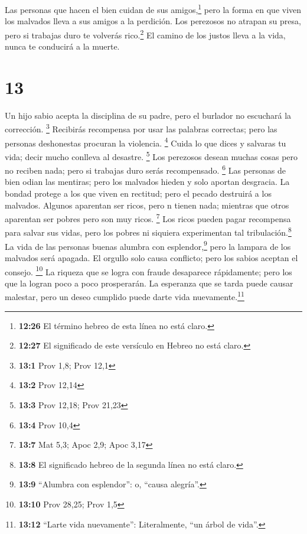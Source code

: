  Las personas que hacen el bien cuidan de sus
amigos,\footnote{\textbf{12:26} El término hebreo de esta línea no está
  claro.} pero la forma en que viven los malvados lleva a sus amigos a
la perdición.  Los perezosos no atrapan su presa, pero si
trabajas duro te volverás rico.\footnote{\textbf{12:27} El significado
  de este versículo en Hebreo no está claro.}  El camino
de los justos lleva a la vida, nunca te conducirá a la muerte.

\hypertarget{section-12}{%
\section{13}\label{section-12}}

 Un hijo sabio acepta la disciplina de su padre, pero el
burlador no escuchará la corrección. \footnote{\textbf{13:1} Prov 1,8;
  Prov 12,1}  Recibirás recompensa por usar las palabras
correctas; pero las personas deshonestas procuran la violencia.
\footnote{\textbf{13:2} Prov 12,14}  Cuida lo que dices y
salvaras tu vida; decir mucho conlleva al desastre. \footnote{\textbf{13:3}
  Prov 12,18; Prov 21,23}  Los perezosos desean muchas
cosas pero no reciben nada; pero si trabajas duro serás recompensado.
\footnote{\textbf{13:4} Prov 10,4}  Las personas de bien
odian las mentiras; pero los malvados hieden y solo aportan desgracia.
 La bondad protege a los que viven en rectitud; pero el
pecado destruirá a los malvados.  Algunos aparentan ser
ricos, pero n tienen nada; mientras que otros aparentan ser pobres pero
son muy ricos. \footnote{\textbf{13:7} Mat 5,3; Apoc 2,9; Apoc 3,17}
 Los ricos pueden pagar recompensa para salvar sus vidas,
pero los pobres ni siquiera experimentan tal tribulación.\footnote{\textbf{13:8}
  El significado hebreo de la segunda línea no está claro.}
 La vida de las personas buenas alumbra con
esplendor,\footnote{\textbf{13:9} ``Alumbra con esplendor'': o, ``causa
  alegría''.} pero la lampara de los malvados será apagada.
 El orgullo solo causa conflicto; pero los sabios aceptan
el consejo. \footnote{\textbf{13:10} Prov 28,25; Prov 1,5}
 La riqueza que se logra con fraude desaparece
rápidamente; pero los que la logran poco a poco prosperarán.
 La esperanza que se tarda puede causar malestar, pero un
deseo cumplido puede darte vida nuevamente.\footnote{\textbf{13:12}
  ``Larte vida nuevamente'': Literalmente, ``un árbol de vida''.}
